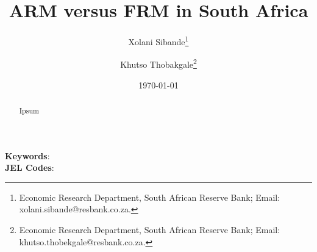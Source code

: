 \title{ARM versus FRM in South Africa}

\author {Xolani Sibande\footnote{Economic Research Department, South African Reserve Bank; Email: xolani.sibande@resbank.co.za.} \and
Khutso Thobakgale\footnote{Economic Research Department, South African Reserve Bank; Email: khutso.thobekgale@resbank.co.za.}}


\date{\today}
\maketitle

\begin{abstract}
Ipsum

\end{abstract}

\noindent\textbf{Keywords}: \\
\textbf{JEL Codes}: 
\newpage